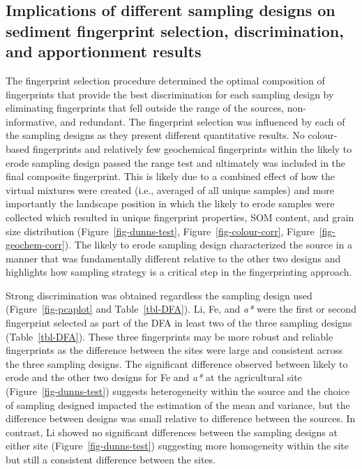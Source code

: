 \documentclass[
  number]{elsarticle}
\begin{document}
\subsection{Implications of different sampling designs on sediment
fingerprint selection, discrimination, and apportionment
results}\label{implications-of-different-sampling-designs-on-sediment-fingerprint-selection-discrimination-and-apportionment-results}

The fingerprint selection procedure determined the optimal composition
of fingerprints that provide the best discrimination for each sampling
design by eliminating fingerprints that fell outside the range of the
sources, non-informative, and redundant. The fingerprint selection was
influenced by each of the sampling designs as they present different
quantitative results. No colour-based fingerprints and relatively few
geochemical fingerprints within the likely to erode sampling design
passed the range test and ultimately was included in the final composite
fingerprint. This is likely due to a combined effect of how the virtual
mixtures were created (i.e., averaged of all unique samples) and more
importantly the landscape position in which the likely to erode samples
were collected which resulted in unique fingerprint properties, SOM
content, and grain size distribution
(Figure~\ref{fig-dunns-test}, Figure~\ref{fig-colour-corr},
Figure~\ref{fig-geochem-corr}). The likely to erode sampling design
characterized the source in a manner that was fundamentally different
relative to the other two designs and highlights how sampling strategy
is a critical step in the fingerprinting approach.

Strong discrimination was obtained regardless the sampling design used
(Figure~\ref{fig-pcaplot} and Table~\ref{tbl-DFA}). Li, Fe, and
\emph{a*} were the first or second fingerprint selected as part of the
DFA in least two of the three sampling designs (Table~\ref{tbl-DFA}).
These three fingerprints may be more robust and reliable fingerprints as
the difference between the sites were large and consistent across the
three sampling designs. The significant difference observed between
likely to erode and the other two designs for Fe and \emph{a*} at the
agricultural site (Figure~\ref{fig-dunns-test}) suggests heterogeneity
within the source and the choice of sampling designed impacted the
estimation of the mean and variance, but the difference between designs
was small relative to difference between the sources. In contrast, Li
showed no significant differences between the sampling designs at either
site (Figure~\ref{fig-dunns-test}) suggesting more homogeneity within
the site but still a consistent difference between the sites.
\end{document}
